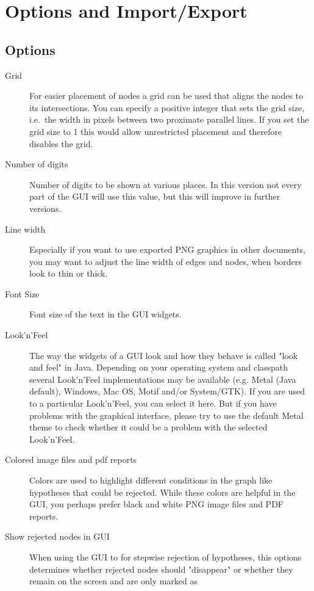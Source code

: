 \documentclass[a4paper, 10pt]{article}\usepackage[]{graphicx}\usepackage[]{color}
\numberwithin{equation}{section}
\theoremstyle{definition}
\theoremstyle{plain}
\begin{document}
\section{Options and Import/Export}

\subsection{Options}

\begin{description}
  \item[Grid] For easier placement of nodes a grid can be used that aligns the
  nodes to its intersections. You can specify a positive integer that sets the
  grid size, i.e.\ the width in pixels between two proximate parallel
  lines. If you set the grid size to 1 this would allow unrestricted placement
  and therefore disables the grid.
  \item[Number of digits] Number of digits to be shown at various places. In
  this version not every part of the GUI will use this value, but this will
  improve in further versions.
  \item[Line width] Especially if you want to use exported PNG graphics in
    other documents, you may want to adjust the line width of edges and nodes,
    when borders look to thin or thick.
  \item[Font Size] Font size of the text in the GUI widgets.
  \item[Look'n'Feel] The way the widgets of a GUI look and how they behave
    is called "look and feel" in Java. Depending on your operating
    system and classpath several Look'n'Feel implementations may be available 
    (e.g. Metal (Java default), Windows, Mac OS, Motif and/or System/GTK).
    If you are used to a particular Look'n'Feel, you can select it here.
    But if you have problems with the graphical interface, please try to use
    the default Metal theme to check whether it could be a problem with the
    selected Look'n'Feel.
  \item[Colored image files and pdf reports] Colors are used to highlight
    different conditions in the graph like hypotheses that could be rejected.
    While these colors are helpful in the GUI, you perhaps prefer black and
    white PNG image files and PDF reports.
  \item[Show rejected nodes in GUI] When using the GUI to for stepwise rejection
    of hypotheses, this options determines whether rejected nodes should
    "disappear" or whether they remain on the screen and are only marked as

\end{description}
\end{document}
